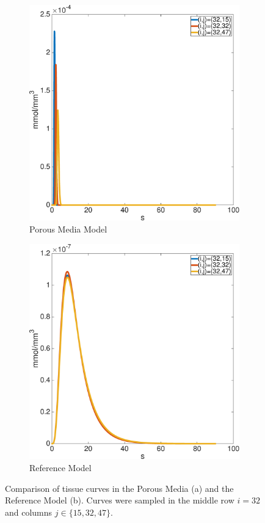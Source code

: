 \documentclass[paper=a4, fontsize=12pt,parskip=half,headings=small]{scrartcl}
\begin{document}
	\begin{figure}[H]
		\centering
		\begin{subfigure}[b]{0.45\textwidth}
			\includegraphics[width=\textwidth]{figs/PM153247.eps}
			\caption{Porous Media Model}
		\end{subfigure}
		\begin{subfigure}[b]{0.45\textwidth}
			\includegraphics[width=\textwidth]{figs/RM153247.eps}			
			\caption{Reference Model}			
		\end{subfigure}		
		\caption{Comparison of tissue curves in the Porous Media (a) and the Reference Model (b). Curves were sampled in the middle row $i=32$ and columns $j \in \{15,32,47\}$.}
		\label{fig:tissuecomp}
	\end{figure}
	
\end{document}
